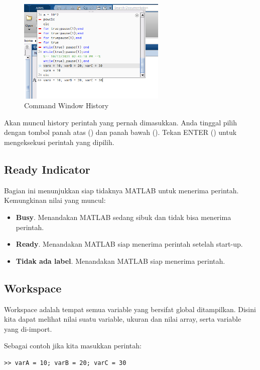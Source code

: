 \documentclass[12pt]{book}
\begin{document}
\begin{itemize}
		\begin{figure}[!ht]
			\centering
			\includegraphics[width=200pt]{images/commandhistory}
			\caption{Command Window History}
		\end{figure}

		Akan muncul history perintah yang pernah dimasukkan.
		Anda tinggal pilih dengan tombol panah atas (\keys{$\uparrow$}) dan panah bawah (\keys{$\downarrow$}).
		Tekan ENTER (\keys{\return}) untuk mengeksekusi perintah yang dipilih.

	\end{itemize}

	\subsection{Ready Indicator}

	Bagian ini menunjukkan siap tidaknya MATLAB untuk menerima perintah.
	Kemungkinan nilai yang muncul:
	\begin{itemize}
		\item \textbf{Busy}. Menandakan MATLAB sedang sibuk dan tidak bisa menerima perintah.
		\item \textbf{Ready}. Menandakan MATLAB siap menerima perintah setelah start-up.
		\item \textbf{Tidak ada label}. Menandakan MATLAB siap menerima perintah.
	\end{itemize}

	\subsection{Workspace}

	Workspace adalah tempat semua variable yang bersifat global ditampilkan.
	Disini kita dapat melihat nilai suatu variable, ukuran dan nilai array, serta variable yang di-import.

	Sebagai contoh jika kita masukkan perintah:
	\begin{verbatim}
>> varA = 10; varB = 20; varC = 30
	\end{verbatim}
\end{document}
